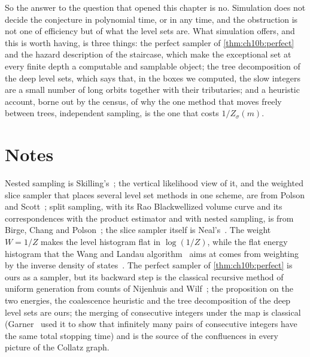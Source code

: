So the answer to the question that opened this chapter is no. Simulation does
not decide the conjecture in polynomial time, or in any time, and the
obstruction is not one of efficiency but of what the level sets are. What
simulation offers, and this is worth having, is three things: the perfect
sampler of \cref{thm:ch10b:perfect} and the hazard description of the staircase,
which make the exceptional set at every finite depth a computable and
samplable object; the tree decomposition of the deep level sets, which says
that, in the boxes we computed, the slow integers are a small number of long orbits
together with their tributaries; and a heuristic account, borne out by the census, of why the one method
that moves freely between trees, independent sampling, is the one that costs
$1/Z_\sigma(m)$.

\section*{Notes}

Nested sampling is Skilling's~\cite{skilling2006};
the vertical likelihood view of it, and the weighted slice sampler that
places several level set methods in one scheme, are from Polson and Scott~\cite{polsonscott2015};
split sampling, with its Rao Blackwellized volume curve and its correspondences with the product estimator and with nested sampling, is from Birge, Chang and Polson~\cite{birge2013}; the slice sampler
itself is Neal's~\cite{neal2003}.
The weight $W=1/Z$ makes the level histogram flat in $\log(1/Z)$, while the flat energy histogram that the Wang and Landau algorithm~\cite{wanglandau2001} aims at comes from weighting by the inverse density of states~\cite[Section~2]{polsonscott2015}.
The perfect sampler of \cref{thm:ch10b:perfect} is ours as a sampler, but its backward step is the classical recursive method of uniform generation from counts of Nijenhuis and Wilf~\cite{nijenhuis1978}; the proposition on the two energies, the
coalescence heuristic and the tree decomposition of the deep level sets are
ours; the merging of consecutive integers under the map is classical (Garner~\cite{garner1985} used it to show that infinitely many pairs of consecutive integers have the same total stopping time) and is
the source of the confluences in every picture of the Collatz graph.

